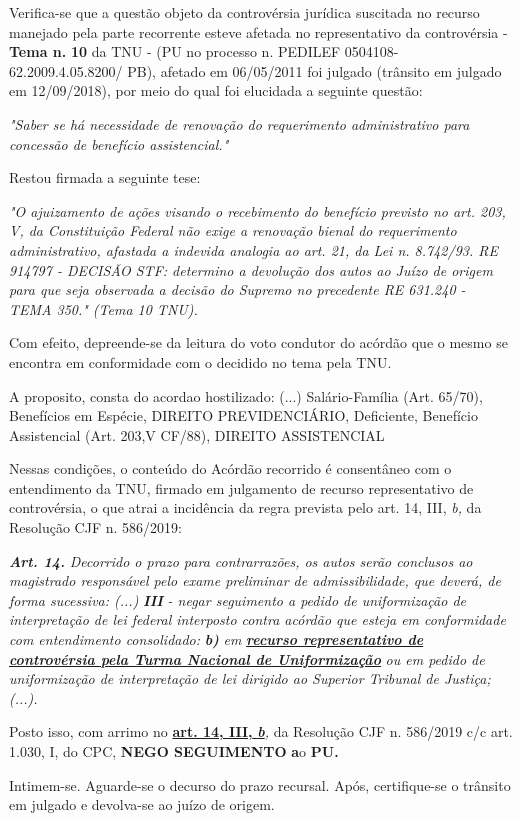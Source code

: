 \documentclass[12pt]{article}
\begin{document}
\justifying
\noindent Verifica-se que a questão objeto da controvérsia jurídica suscitada no recurso manejado pela parte recorrente esteve afetada no representativo da controvérsia - \textbf{Tema n. }\textbf{10} da TNU - (PU no processo n. PEDILEF 0504108- 62.2009.4.05.8200/ PB),  afetado em 06/05/2011 foi julgado (trânsito em julgado em 12/09/2018), por meio do qual foi elucidada a seguinte questão:

\noindent \textit{"Saber se há necessidade de renovação do requerimento administrativo para concessão de benefício assistencial."}

\noindent Restou firmada a seguinte tese:

\noindent \textit{"O ajuizamento de ações visando o recebimento do benefício previsto no art. 203, V, da Constituição Federal não exige a renovação bienal do requerimento administrativo, afastada a indevida analogia ao art. 21, da Lei n. 8.742/93. RE 914797 - DECISÃO STF: determino a devolução dos autos ao Juízo de origem para que seja observada a decisão do Supremo no precedente RE 631.240 - TEMA 350." (Tema 10 TNU).}

\noindent Com efeito, depreende-se da leitura do voto condutor do acórdão que o mesmo se encontra em conformidade com o decidido no  tema pela TNU.

\noindent A proposito, consta do acordao hostilizado: (...) Salário-Família (Art. 65/70), Benefícios em Espécie, DIREITO PREVIDENCIÁRIO, Deficiente, Benefício Assistencial (Art. 203,V CF/88), DIREITO ASSISTENCIAL

\noindent Nessas condições, o conteúdo do Acórdão recorrido é consentâneo com o entendimento da TNU, firmado em julgamento de recurso representativo de controvérsia, o que atrai a incidência da regra prevista pelo art. 14, III, \textit{b,} da Resolução CJF n. 586/2019:

\noindent \textit{\textbf{Art. 14.}}\textit{ Decorrido o prazo para contrarrazões, os autos serão conclusos ao magistrado responsável pelo exame preliminar de admissibilidade, que deverá, de forma sucessiva: (...) }\textit{\textbf{III }}\textit{- negar seguimento a pedido de uniformização de interpretação de lei federal interposto contra acórdão que esteja em conformidade com entendimento consolidado: }\textit{\textbf{b)}}\textit{ em }\uline{\textit{\textbf{recurso representativo de controvérsia pela Turma Nacional de Uniformização}}}\textit{ ou em pedido de uniformização de interpretação de lei dirigido ao Superior Tribunal de Justiça;(...).}

\noindent Posto isso, com arrimo no \uline{\textbf{art. 14, III, }}\uline{\textit{\textbf{b}}}\textit{,} da Resolução CJF n. 586/2019 c/c art. 1.030, I, do CPC, \textbf{NEGO SEGUIMENTO }\textbf{a}o\textbf{ PU}\textbf{.}

\noindent Intimem-se. Aguarde-se o decurso do prazo recursal. Após, certifique-se o trânsito em julgado e devolva-se ao juízo de origem.
\end{document}
